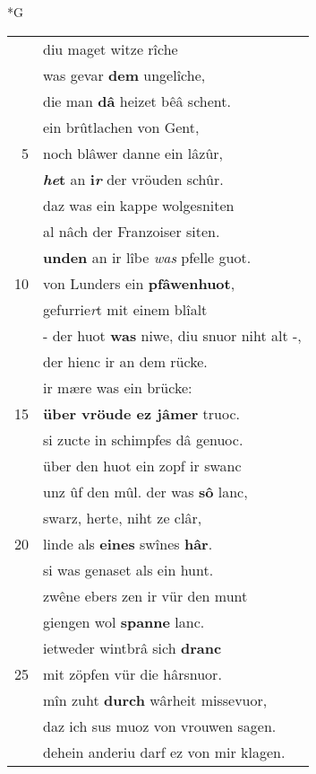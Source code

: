 \documentclass[8pt,a4paper,notitlepage]{article}
\begin{document}
\newpage
\begin{table}[ht]
\begin{minipage}[t]{0.5\linewidth}
\small
\begin{center}*G
\end{center}
\begin{tabular}{rl}
 & diu maget witze rîche\\ 
 & was gevar \textbf{dem} ungelîche,\\ 
 & die man \textbf{dâ} heizet bêâ schent.\\ 
 & ein brûtlachen von Gent,\\ 
5 & noch blâwer danne ein lâzûr,\\ 
 & \textbf{\textit{he}t} an \textbf{i\textit{r}} der vröuden schûr.\\ 
 & daz was ein kappe wolgesniten\\ 
 & al nâch der Franzoiser siten.\\ 
 & \textbf{unden} an ir lîbe \textit{was} pfelle guot.\\ 
10 & von Lunders ein \textbf{pfâwenhuot},\\ 
 & gefurrie\textit{r}t mit einem blîalt\\ 
 & - der huot \textbf{was} niwe, diu snuor niht alt -,\\ 
 & der hienc ir an dem rücke.\\ 
 & ir mære was ein brücke:\\ 
15 & \textbf{über vröude ez jâmer} truoc.\\ 
 & si zucte in schimpfes dâ genuoc.\\ 
 & über den huot ein zopf ir swanc\\ 
 & unz ûf den mûl. der was \textbf{sô} lanc,\\ 
 & swarz, herte, niht ze clâr,\\ 
20 & linde als \textbf{eines} swînes \textbf{hâr}.\\ 
 & si was genaset als ein hunt.\\ 
 & zwêne ebers zen ir vür den munt\\ 
 & giengen wol \textbf{spanne} lanc.\\ 
 & ietweder wintbrâ sich \textbf{dranc}\\ 
25 & mit zöpfen vür die hârsnuor.\\ 
 & mîn zuht \textbf{durch} wârheit missevuor,\\ 
 & daz ich sus muoz von vrouwen sagen.\\ 
 & dehein anderiu darf ez von mir klagen.\\ 

\end{tabular}
\end{minipage}
\end{table}
\end{document}
